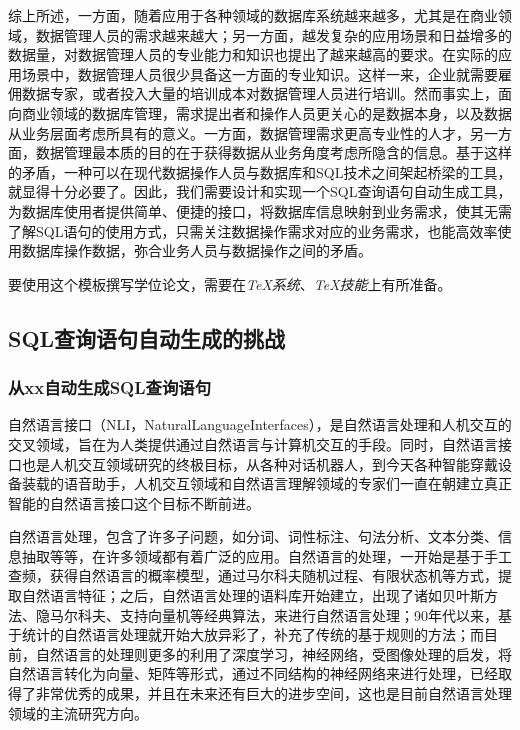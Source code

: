 综上所述，一方面，随着应用于各种领域的数据库系统越来越多，尤其是在商业领域，数据管理人员的需求越来越大；另一方面，越发复杂的应用场景和日益增多的数据量，对数据管理人员的专业能力和知识也提出了越来越高的要求。在实际的应用场景中，数据管理人员很少具备这一方面的专业知识。这样一来，企业就需要雇佣数据专家，或者投入大量的培训成本对数据管理人员进行培训。然而事实上，面向商业领域的数据库管理，需求提出者和操作人员更关心的是数据本身，以及数据从业务层面考虑所具有的意义。一方面，数据管理需求更高专业性的人才，另一方面，数据管理最本质的目的在于获得数据从业务角度考虑所隐含的信息。基于这样的矛盾，一种可以在现代数据操作人员与数据库和SQL技术之间架起桥梁的工具，就显得十分必要了。因此，我们需要设计和实现一个SQL查询语句自动生成工具，为数据库使用者提供简单、便捷的接口，将数据库信息映射到业务需求，使其无需了解SQL语句的使用方式，只需关注数据操作需求对应的业务需求，也能高效率使用数据库操作数据，弥合业务人员与数据操作之间的矛盾。

要使用这个模板撰写学位论文，需要在\emph{TeX系统}、\emph{TeX技能}上有所准备。


\subsection{SQL查询语句自动生成的挑战}
\label{intro:sqlag}
\subsubsection{从xx自动生成SQL查询语句}
自然语言接口（NLI，NaturalLanguageInterfaces），是自然语言处理和人机交互的交叉领域，旨在为人类提供通过自然语言与计算机交互的手段。同时，自然语言接口也是人机交互领域研究的终极目标，从各种对话机器人，到今天各种智能穿戴设备装载的语音助手，人机交互领域和自然语言理解领域的专家们一直在朝建立真正智能的自然语言接口这个目标不断前进。

自然语言处理，包含了许多子问题，如分词、词性标注、句法分析、文本分类、信息抽取等等，在许多领域都有着广泛的应用。自然语言的处理，一开始是基于手工查频，获得自然语言的概率模型，通过马尔科夫随机过程、有限状态机等方式，提取自然语言特征；之后，自然语言处理的语料库开始建立，出现了诸如贝叶斯方法、隐马尔科夫、支持向量机等经典算法，来进行自然语言处理；90年代以来，基于统计的自然语言处理就开始大放异彩了，补充了传统的基于规则的方法；而目前，自然语言的处理则更多的利用了深度学习，神经网络，受图像处理的启发，将自然语言转化为向量、矩阵等形式，通过不同结构的神经网络来进行处理，已经取得了非常优秀的成果，并且在未来还有巨大的进步空间，这也是目前自然语言处理领域的主流研究方向。

